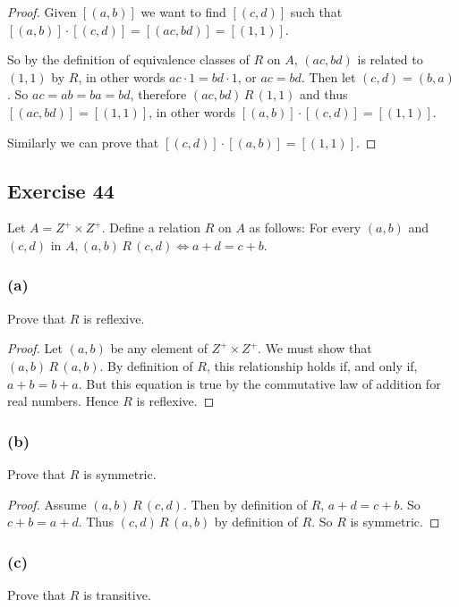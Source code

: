 \documentclass[14pt]{extarticle}
\begin{document}
\begin{proof}
        Given \([(a,b)]\) we want to find \([(c,d)]\) such that \([(a,b)] \cdot [(c,d)] = [(ac,bd)] = [(1,1)]\).

        So by the definition of equivalence classes of $R$ on $A$, \((ac,bd)\) is related to \((1,1)\) by $R$, in other words
        \(ac \cdot 1 = bd \cdot 1\), or \(ac = bd\). Then let \((c,d) = (b,a)\). So \(ac = ab = ba = bd\), therefore
        \((ac,bd) \,R\, (1,1)\) and thus \([(ac,bd)] = [(1,1)]\), in other words \([(a,b)] \cdot [(c,d)] = [(1,1)]\).

        Similarly we can prove that \([(c,d)] \cdot [(a,b)] = [(1,1)]\).
\end{proof}

\subsection{Exercise 44}
Let \(A = Z^+ \times Z^+\). Define a relation \(R\) on \(A\) as follows: For every \((a, b)\) and \((c, d)\) in
\(A, (a, b) \,R\, (c, d) \iff a + d = c + b\).

\subsubsection{(a)}
Prove that $R$ is reflexive.

\begin{proof}
        Let \((a, b)\) be any element of \(Z^+ \times Z^+\). We must show that \((a, b) \,R\, (a, b)\). By definition of
        $R$, this relationship holds if, and only if, \(a + b = b + a\). But this equation is true by the commutative law of
        addition for real numbers. Hence \(R\) is reflexive.
\end{proof}

\subsubsection{(b)}
Prove that $R$ is symmetric.

\begin{proof}
        Assume \((a, b) \,R\, (c, d)\). Then by definition of $R$, \(a + d = c + b\). So \(c + b = a + d\). Thus
        \((c, d) \,R\, (a, b)\) by definition of $R$. So $R$ is symmetric.
\end{proof}

\subsubsection{(c)}
Prove that $R$ is transitive.
\end{document}

